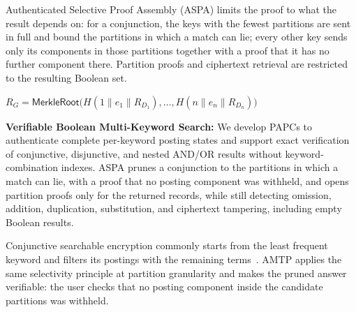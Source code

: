 Authenticated Selective Proof Assembly (ASPA) limits the proof to what the result depends on: for a
conjunction, the keys with the fewest partitions are sent in full and bound the partitions in which a
match can lie; every other key sends only its components in those partitions together with a proof
that it has no further component there. Partition proofs and ciphertext retrieval are restricted to
the resulting Boolean set.


$R_G = \mathsf{MerkleRoot}\big(H(1 \| e_1 \| R_{D_1}), \dots, H(n \| e_n \| R_{D_n})\big)$


\item \textbf{Verifiable Boolean Multi-Keyword Search:} We develop PAPCs to authenticate complete
per-keyword posting states and support exact verification of conjunctive, disjunctive, and nested
AND/OR results without keyword-combination indexes. ASPA prunes a conjunction to the partitions in
which a match can lie, with a proof that no posting component was withheld, and opens partition proofs
only for the returned records, while still detecting omission, addition, duplication, substitution,
and ciphertext tampering, including empty Boolean results.




Conjunctive searchable encryption commonly starts from the least frequent keyword and filters its
postings with the remaining terms~\cite{cash2013oxt}. AMTP applies the same selectivity principle at
partition granularity and makes the pruned answer verifiable: the user checks that no posting component
inside the candidate partitions was withheld.


